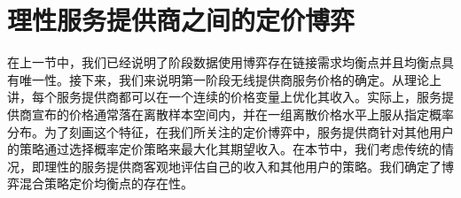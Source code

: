 
\section{理性服务提供商之间的定价博弈}\label{sec:stageI}
在上一节中，我们已经说明了阶段\uppercase\expandafter{}数据使用博弈存在链接需求均衡点并且均衡点具有唯一性。接下来，我们来说明第一阶段无线提供商服务价格的确定。从理论上讲，每个服务提供商都可以在一个连续的价格变量上优化其收入。实际上，服务提供商宣布的价格通常落在离散样本空间内，并在一组离散价格水平上服从指定概率分布。为了刻画这个特征，在我们所关注的定价博弈中，服务提供商针对其他用户的策略通过选择概率定价策略来最大化其期望收入。在本节中，我们考虑传统的情况，即理性的服务提供商客观地评估自己的收入和其他用户的策略。我们确定了博弈混合策略定价均衡点的存在性。

